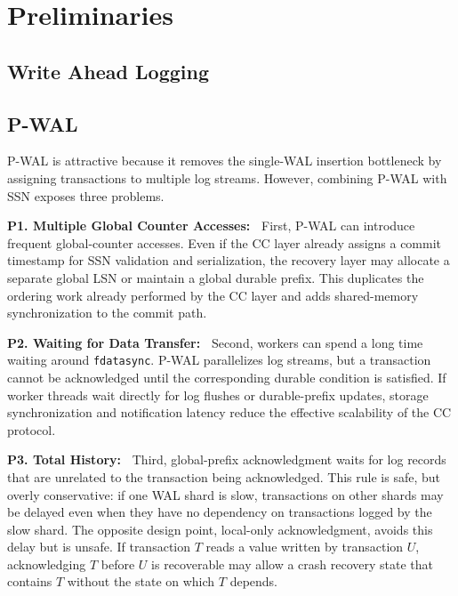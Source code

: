 \section{Preliminaries}
\label{sec:background}
\subsection{Write Ahead Logging}


\subsection{P-WAL}


P-WAL is attractive because it removes the single-WAL insertion bottleneck by assigning transactions to multiple log streams.  However, combining P-WAL with SSN exposes three
problems.

\textbf{P1. Multiple Global Counter Accesses:~} First, P-WAL can introduce frequent global-counter accesses.  Even if the CC
layer already assigns a commit timestamp for SSN validation and serialization, the recovery layer may allocate a separate global LSN or maintain a global durable prefix.  This duplicates the ordering work already performed by the CC layer and adds shared-memory synchronization to the commit path.

\textbf{P2. Waiting for Data Transfer:~} Second, workers can spend a long time waiting around \texttt{fdatasync}.  P-WAL parallelizes log streams, but a transaction cannot be acknowledged until the corresponding durable condition is satisfied.  If worker threads wait directly
for log flushes or durable-prefix updates, storage synchronization and notification latency reduce the effective scalability of the CC protocol.

\textbf{P3. Total History:~} Third, global-prefix acknowledgment waits for log records that are unrelated to the transaction being acknowledged.  This rule is safe, but overly conservative:
if one WAL shard is slow, transactions on other shards may be delayed even when they have no dependency on transactions logged by the slow shard.  The opposite design point, local-only acknowledgment, avoids this delay but is unsafe.  If transaction $T$ reads a value written by transaction $U$, acknowledging $T$ before $U$ is recoverable may allow a crash recovery state that contains $T$ without the state on which $T$ depends.
